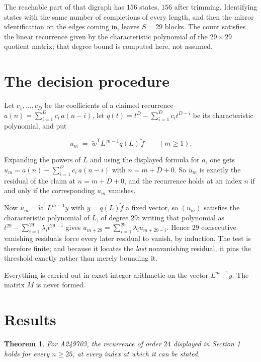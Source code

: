 \documentclass[11pt]{article}
\newtheorem{theorem}{Theorem}
\theoremstyle{definition}
\begin{document}
The reachable part of that digraph has $156$ states, $156$ after trimming. Identifying states with the same number of completions of every length, and then the mirror identification on the edges coming in, leaves $S = 29$ blocks. The count satisfies the linear recurrence given by the characteristic polynomial of the $29\times29$ quotient matrix; that degree bound is computed here, not assumed.

\section{The decision procedure}

Let $c_1,\dots,c_D$ be the coefficients of a claimed recurrence $a(n) = \sum_{i=1}^{D} c_i\,a(n-i)$, let $q(t) = t^{D} - \sum_{i=1}^{D} c_i t^{D-i}$ be its characteristic polynomial, and put

\[u_m \;=\; \tilde w^{\mathsf T} L^{\,m-1} q(L)\,\tilde f \qquad (m \ge 1).\]

Expanding the powers of $L$ and using the displayed formula for $a$, one gets $u_m = a(n) - \sum_{i=1}^{D} c_i\,a(n-i)$ with $n = m + D + 0$. So $u_m$ is exactly the residual of the claim at $n = m + D + 0$, and the recurrence holds at an index $n$ if and only if the corresponding $u_m$ vanishes.

Now $u_m = \tilde w^{\mathsf T} L^{m-1} y$ with $y = q(L)\tilde f$ a fixed vector, so $(u_m)$ satisfies the characteristic polynomial of $L$, of degree $29$: writing that polynomial as $t^{29} - \sum_{i=1}^{29} \lambda_i t^{29-i}$ gives $u_{m+29} = \sum_{i=1}^{29} \lambda_i u_{m+29-i}$. Hence $29$ consecutive vanishing residuals force every later residual to vanish, by induction. The test is therefore finite; and because it locates the {\itshape last} nonvanishing residual, it pins the threshold exactly rather than merely bounding it.

Everything is carried out in exact integer arithmetic on the vector $L^{m-1}y$. The matrix $M$ is never formed.

\section{Results}

\begin{theorem} For A249703, the recurrence of order $24$ displayed in Section 1 holds for every $n \ge 25$, at every index at which it can be stated.\end{theorem}
\end{document}
